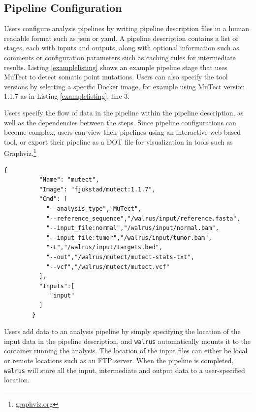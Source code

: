 \subsection{Pipeline Configuration}
Users configure analysis pipelines by writing pipeline description files in a
human readable format such as \gls{json} or \gls{yaml}. A pipeline description
contains a list of stages, each with inputs and outputs, along with optional
information such as comments or configuration parameters such as caching rules
for intermediate results. Listing \ref{examplelisting} shows an example pipeline
stage that uses MuTect\cite{mutect} to detect somatic point mutations. Users
can also specify the tool versions by selecting a specific Docker image, for
example using MuTect version 1.1.7 as in Listing \ref{examplelisting}, line 3. 

Users specify the flow of data in the pipeline within the pipeline description,
as well as the dependencies between the steps. Since pipeline configurations can
become complex, users can view their pipelines using an interactive web-based
tool, or export their pipeline as a DOT file for visualization in tools such as
Graphviz.\footnote{\url{graphviz.org}}

\begin{lstlisting}[caption={Example pipeline stage for a tool that detects
somatic point mutations. It reads a reference sequence file together with both
tumor and normal sequences, and produces an output file with the detected
mutations.},
label={examplelisting}, 
basicstyle=\ttfamily\scriptsize]
        {
          "Name": "mutect",
          "Image": "fjukstad/mutect:1.1.7",
          "Cmd": [
            "--analysis_type","MuTect",
            "--reference_sequence","/walrus/input/reference.fasta",
            "--input_file:normal","/walrus/input/normal.bam",
            "--input_file:tumor","/walrus/input/tumor.bam",
            "-L","/walrus/input/targets.bed",
            "--out","/walrus/mutect/mutect-stats-txt",
            "--vcf","/walrus/mutect/mutect.vcf"
          ],
          "Inputs":[
             "input" 
          ]
        }
\end{lstlisting}

Users add data to an analysis pipeline by simply specifying the location of the
input data in the pipeline description, and \texttt{walrus} automatically mounts
it to the container running the analysis. The location of the input files can
either be local or remote locations such as an FTP server. When the pipeline is
completed, \texttt{walrus} will store all the input, intermediate and output
data to a user-specified location.  

